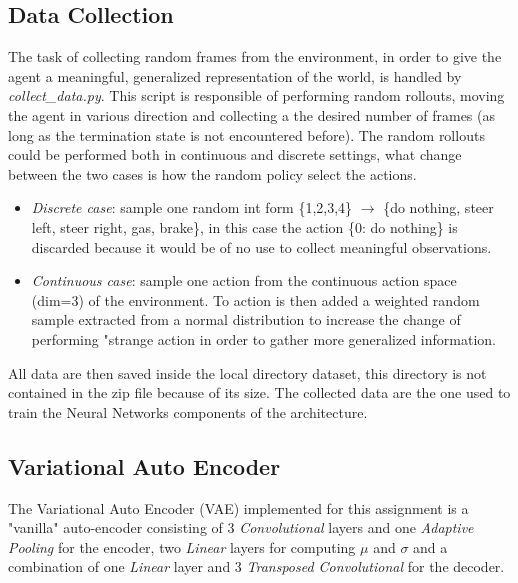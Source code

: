 \documentclass[10pt,a4paper]{article}
\begin{document}
\subsection{Data Collection}
The task of collecting random frames from the environment, in order to give the agent a meaningful, generalized representation of the world, is handled by \textit{collect\_data.py}. This script is responsible of performing random rollouts, moving the agent in various direction and collecting a the desired number of frames (as long as the termination state is not encountered before). The random rollouts could be performed both in continuous and discrete settings, what change between the two cases is how the random policy select the actions.
\begin{itemize}
    \item \textit{Discrete case}: sample one random int form \{1,2,3,4\} $\rightarrow$ \{do nothing, steer left, steer right, gas, brake\}, in this case the action \{0: do nothing\} is discarded because it would be of no use to collect meaningful observations. 
    \item \textit{Continuous case}: sample one action from the continuous action space (dim=3) of the environment. To action is then added a weighted random sample extracted from a normal distribution to increase the change of performing "strange action in order to gather more generalized information. 
\end{itemize}
All data are then saved inside the local directory dataset, this directory is not contained in the zip file because of its size. The collected data are the one used to train the Neural Networks components of the architecture.
\newpage
\subsection{Variational Auto Encoder}
The Variational Auto Encoder (VAE) implemented for this assignment is a "vanilla" auto-encoder consisting of 3 \textit{Convolutional} layers and one \textit{Adaptive Pooling} for the encoder, two \textit{Linear} layers for computing $\mu$ and $\sigma$ and a combination of one \textit{Linear} layer and 3 \textit{Transposed Convolutional} for the decoder.
\end{document}
